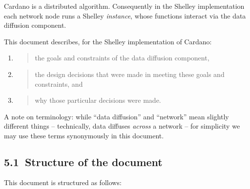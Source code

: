 \documentclass[11pt,a4paper]{article}
\begin{document}
Cardano is a distributed algorithm. Consequently in the Shelley
implementation each network node runs a Shelley \emph{instance}, whose
functions interact via the data diffusion component.

This document describes, for the Shelley implementation of Cardano:

\begin{enumerate}
\def\labelenumi{\arabic{enumi}.}
\item
  \begin{quote}
  the goals and constraints of the data diffusion component,
  \end{quote}
\item
  \begin{quote}
  the design decisions that were made in meeting these goals and
  constraints, and
  \end{quote}
\item
  \begin{quote}
  why those particular decisions were made.
  \end{quote}
\end{enumerate}

A note on terminology: while ``data diffusion'' and ``network'' mean
slightly different things -- technically, data diffuses \emph{across} a
network -- for simplicity we may use these terms synonymously in this
document.

\hypertarget{structure-of-the-document}{%
\subsection{​5.1​~Structure of the
document}\label{structure-of-the-document}}


This document is structured as follows:
\end{document}
